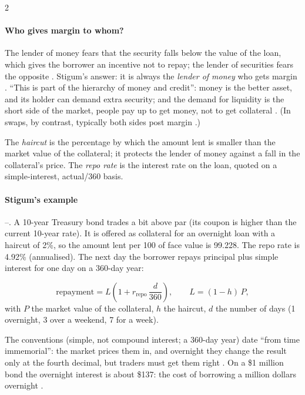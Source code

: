 \begin{paracol}{2}
\paragraph{Who gives margin to whom?} The lender of money fears that the security falls below the value of the loan, which gives the borrower an incentive not
to repay; the lender of securities fears the opposite . Stigum's answer: it is always the \emph{lender of money} who gets margin
. ``This is part of the hierarchy of money and credit'': money is the better asset, and its holder can demand extra security; and the demand for
liquidity is the short side of the market, people pay up to get money, not to get collateral . (In swaps, by contrast,
typically both sides post margin .)

\begin{definition}
The \emph{haircut} is the percentage by which the amount lent is smaller than the market value of the collateral; it protects the lender of money against a fall
in the collateral's price. The \emph{repo rate} is the interest rate on the loan, quoted on a simple-interest, actual/360 basis.
\end{definition}

\paragraph{Stigum's example} --. A 10-year Treasury bond trades a bit above par (its coupon is higher than the current 10-year
rate). It is offered as collateral for an overnight loan with a haircut of 2\%, so the amount lent per 100 of face value is 99.228. The repo rate is 4.92\%
(annualised). The next day the borrower repays principal plus simple interest for one day on a 360-day year:
\begin{keyformulas}
\[
  \text{repayment} = L\left(1 + r_{\text{repo}}\,\frac{d}{360}\right),\qquad L = (1-h)\,P ,
\]
with $P$ the market value of the collateral, $h$ the haircut, $d$ the number of days (1 overnight, 3 over a weekend, 7 for a week).
\end{keyformulas}
The conventions (simple, not compound interest; a 360-day year) date ``from time immemorial'': the market prices them in, and overnight they change the result
only at the fourth decimal, but traders must get them right . On a \$1 million bond the overnight interest
is about \$137: the cost of borrowing a million dollars overnight .


\end{paracol}
